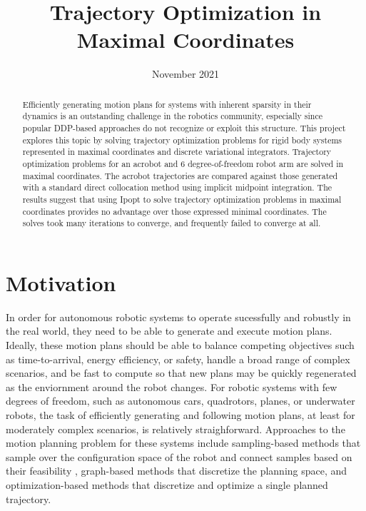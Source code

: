 \documentclass[conference]{IEEEtran}
\title{\LARGE \bf
    Trajectory Optimization in Maximal Coordinates
}
\date{November 2021}
\author{\IEEEauthorblockN{Brian E. Jackson$^*$}
    \IEEEauthorblockA{\textit{Robotics Institute} \\
    \textit{Carnegie Mellon University}\\
    Pittsburgh, USA \\
    brianjackson@cmu.edu}
}
\begin{document}
\maketitle

\begin{abstract}
    Efficiently generating motion plans for systems with inherent sparsity in their 
    dynamics is an outstanding challenge in the robotics community, especially since 
    popular DDP-based approaches do not recognize or exploit this structure. 
    This project explores this topic by solving trajectory optimization problems for 
    rigid body systems represented in maximal coordinates and discrete variational 
    integrators. 
    Trajectory optimization problems for an acrobot and 6 degree-of-freedom robot arm 
    are solved in maximal coordinates. The acrobot trajectories are compared against 
    those generated with a standard direct collocation method using implicit midpoint 
    integration. The results suggest that using Ipopt to solve trajectory optimization 
    problems in maximal coordinates provides no advantage over those expressed minimal 
    coordinates. The solves took many iterations to converge, and frequently failed 
    to converge at all. 
\end{abstract}

\section{Motivation}
In order for autonomous robotic systems to operate sucessfully and robustly in the real 
world, they need to be able to generate and execute motion plans. Ideally, these motion 
plans should be able to balance competing objectives such as time-to-arrival, energy 
efficiency, or safety, handle a broad range of complex scenarios, and be fast to compute
so that new plans may be quickly regenerated as the enviornment around the robot changes.
For robotic systems with few degrees of freedom, such as autonomous cars, quadrotors, planes,
or underwater robots, the task of efficiently generating and following motion plans, at least
for moderately complex scenarios, is relatively straighforward. Approaches to the motion 
planning problem for these systems include sampling-based methods that sample over the 
configuration space of the robot and connect samples based on their feasibility 
\cite{lavalle2001rapidly}, graph-based
methods that discretize the planning space, and optimization-based methods 
\cite{howell_ALTRO_2019,jackson_ALTROC_2021,li_Iterative_2004,hargraves_Direct_1987} that 
discretize and optimize a single planned trajectory. 
\end{document}
